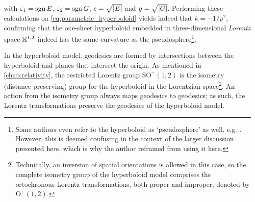 with \(\varepsilon_1 = \operatorname{sgn}{E}\), \(\varepsilon_2 = \operatorname{sgn}{G}\), \(e = \sqrt{\abs{E}}\) and \(g = \sqrt{\abs{G}}\).
Performing these calculations on \cref{eq:parametric_hyperboloid} yields indeed that \(k = -1/\rho^2\), confirming that the one-sheet hyperboloid embedded in three-dimensional \emph{Lorentz} space $\mathbb{R}^{1,2}$ indeed has the same curvature as the pseudosphere\footnote{Some authors even refer to the hyperboloid as `pseudosphere' as well, e.g. \citet{Balazs1986}. However, this is deemed confusing in the context of the larger discussion presented here, which is why the author refrained from using it here.}.

In the hyperboloid model, geodesics are formed by intersections between the hyperboloid and planes that intersect the origin. As mentioned in \cref{chap:relativity}, the restricted Lorentz group $\text{SO}^+(1, 2)$ is the isometry (distance-preserving) group for the hyperboloid in the Lorentzian space\footnote{Technically, an inversion of spatial orientations is allowed in this case, so the complete isometry group of the hyperboloid model comprises the ortochronous Lorentz transformations, both proper and improper, denoted by $\text{O}^+(1, 2)$.}. An action from the isometry group always maps geodesics to geodesics; as such, the Lorentz transformations preserve the geodesics of the hyperboloid model.

